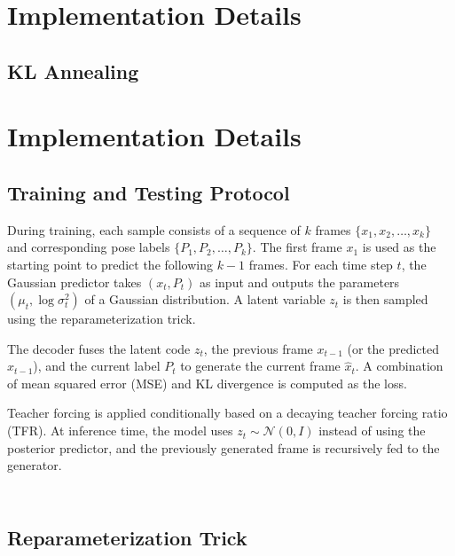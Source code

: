 \section{Implementation Details}
\label{sec:implementation}


\subsection{KL Annealing}
\label{sec:kl_annealing}
\cite{fu_cyclical_2019_naacl}


\section{Implementation Details}

\subsection{Training and Testing Protocol}

During training, each sample consists of a sequence of $k$ frames $\{x_1, x_2, \ldots, x_k\}$ and corresponding pose labels $\{P_1, P_2, \ldots, P_k\}$. The first frame $x_1$ is used as the starting point to predict the following $k-1$ frames. For each time step $t$, the Gaussian predictor takes $(x_t, P_t)$ as input and outputs the parameters $(\mu_t, \log \sigma^2_t)$ of a Gaussian distribution. A latent variable $z_t$ is then sampled using the reparameterization trick.

The decoder fuses the latent code $z_t$, the previous frame $x_{t-1}$ (or the predicted $\hat{x}_{t-1}$), and the current label $P_t$ to generate the current frame $\hat{x}_t$. A combination of mean squared error (MSE) and KL divergence is computed as the loss.

Teacher forcing is applied conditionally based on a decaying teacher forcing ratio (TFR). At inference time, the model uses $z_t \sim \mathcal{N}(0, I)$ instead of using the posterior predictor, and the previously generated frame is recursively fed to the generator.

\inputminted[firstline=124, lastline=132, highlightlines={127}]{python}{../Trainer.py}
\inputminted[firstline=179, lastline=216, highlightlines={191-193, 201}]{python}{../Trainer.py}

\subsection{Reparameterization Trick}


